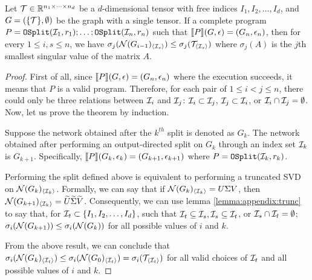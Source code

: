 \begin{theorem}\label{thm:appendix:sv-bound}
Let $\mathcal{T} \in \mathbb{R}^{n_1 \times \cdots \times n_d}$ be a $d$-dimensional tensor with free indices $I_1, I_2, \ldots, I_d$, and $G=(\{\mathcal{T}\},\emptyset)$ be the graph with a single tensor.
%
If a complete program $P = \mathtt{OSplit}(\mathcal{I}_1, r_1); \ldots; \mathtt{OSplit}(\mathcal{I}_n, r_n)$ such that $\llbracket P \rrbracket(G, \epsilon) = (G_n, \epsilon_n)$,
then for every $1 \leq i, s \leq n$, we have $\sigma_j(\mathcal{N}(G_{i-1})_{\langle\mathcal{I}_s\rangle}) \leq \sigma_j(\mathcal{T}_{\langle\mathcal{I}_s\rangle})$ where $\sigma_j(A)$ is the $j$th smallest singular value of the matrix $A$.
\end{theorem}
\begin{proof}
First of all, since $\llbracket P \rrbracket(G, \epsilon) = (G_n, \epsilon_n)$ where the execution succeeds, it means that $P$ is a valid program.
%
Therefore, for each pair of $1 \leq i < j \leq n$, there could only be three relations between $\mathcal{I}_i$ and $\mathcal{I}_j$: $\mathcal{I}_i \subset \mathcal{I}_j$, $\mathcal{I}_j \subset \mathcal{I}_i$, or $\mathcal{I}_i \cap \mathcal{I}_j = \emptyset$.
%
Now, let us prove the theorem by induction.

Suppose the network obtained after the $k^{th}$ split is denoted as $G_k$. The network obtained after performing an output-directed split on $G_k$ through an index set $\mathcal{I}_k$ is $G_{k+1}$. Specifically, $\llbracket P \rrbracket(G_k, \epsilon_k) = (G_{k+1}, \epsilon_{k+1})$ where $P = \mathtt{OSplit}(\mathcal{I}_k, r_k)$.

Performing the split defined above is equivalent to performing a truncated SVD on $\mathcal{N}(G_k)_{\langle 
\mathcal{I}_k \rangle}$. Formally, we can say that if $\mathcal{N}(G_k)_{\langle 
\mathcal{I}_k \rangle} = U \Sigma V$, then $\mathcal{N}(G_{k+1})_{\langle 
\mathcal{I}_k \rangle} = \widetilde{U} \widetilde{\Sigma} \widetilde{V}$. Consequently, we can use lemma \ref{lemma:appendix:trunc} to say that, for $\mathcal{I}_t \subset \{I_1, I_2, \ldots, I_d\}$, such that $\mathcal{I}_t \subseteq \mathcal{I}_s, \mathcal{I}_s \subseteq \mathcal{I}_t$, or $\mathcal{I}_s \cap \mathcal{I}_t = \emptyset$; $\sigma_i(\mathcal{N}(G_{k+1})) \leq \sigma_i(\mathcal{N}(G_k))$ for all possible values of $i$ and $k$.

From the above result, we can conclude that $\sigma_i(\mathcal{N}(G_{k})_{\langle 
\mathcal{I}_t \rangle}) \leq \sigma_i(\mathcal{N}(G_0)_{\langle 
\mathcal{I}_t \rangle}) = \sigma_i(\mathcal{T}_{\langle 
\mathcal{I}_t \rangle})$ for all valid choices of $\mathcal{I}_t$ and all possible values of $i$ and $k$.

\end{proof}

